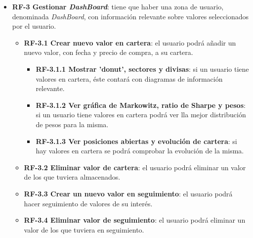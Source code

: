 \begin{itemize}
\item
\textbf{RF-3 Gestionar \emph{DashBoard}}: tiene que haber una zona de usuario, denominada \emph{DashBoard}, con información relevante sobre valores seleccionados por el usuario. 
	\begin{itemize}
        \item \textbf{RF-3.1 Crear nuevo valor en cartera}: el usuario podrá añadir un 
        nuevo valor, con fecha y precio de compra, a su cartera.
        \begin{itemize}
            \item \textbf{RF-3.1.1 Mostrar 'donut', sectores y divisas}: si un usuario 
            tiene valores en cartera, éste contará con diagramas de información relevante.
            \item \textbf{RF-3.1.2 Ver gráfica de Markowitz, ratio de Sharpe y pesos}: si 
            un usuario tiene valores en cartera podrá ver lla mejor distribución de pesos 
            para la misma. 
            \item \textbf{RF-3.1.3 Ver posiciones abiertas y evolución de cartera}: si hay 
            valores en cartera se podrá comprobar la evolución de la misma. 
        \end{itemize}
		\item \textbf{RF-3.2 Eliminar valor de cartera}: el usuario podrá eliminar un 
        valor de los que tuviera almacenados. 
        \item \textbf{RF-3.3 Crear un nuevo valor en seguimiento}: el usuario podrá 		
        hacer seguimiento de valores de su interés.
        \item \textbf{RF-3.4 Eliminar valor de seguimiento}: el usuario podrá eliminar un 
        valor de los que tuviera en seguimiento. 
	\end{itemize}


\end{itemize}
